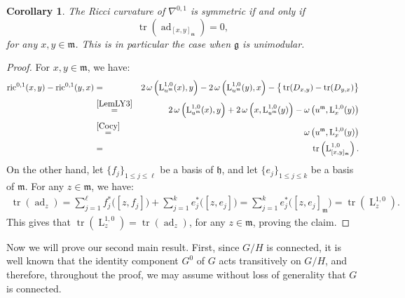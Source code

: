\documentclass[preprint,12pt,1p]{elsarticle}
\theoremstyle{plain}
\newtheorem{corollary}[theorem]{Corollary}
\theoremstyle{definition}
\newcommand{\n}{\nabla}
\newcommand{\nc}{\n^{0,1}}
\newcommand{\tr}{\operatorname{tr}}
\newcommand{\h}{\mathfrak{h}}
\newcommand{\m}{\mathfrak{m}}
\newcommand{\ad}{\operatorname{ad}}
\newcommand{\lm}{\operatorname{L}^{1,0}}
\newcommand{\ric}{\operatorname{ric}}
\numberwithin{equation}{section}
\newcommand{\somjk}{\displaystyle\sum_{j=1}^{k}}
\newcommand{\somjl}{\displaystyle\sum_{j=1}^{\ell}}
\begin{document}
\begin{corollary}\label{SymRicA}
The Ricci curvature of $\nc$ is symmetric if and only if
\begin{equation}
\tr\left(\ad_{[x,y]_\mathfrak{m}}\right)=0,
\end{equation}
for any $x,y\in\mathfrak{m}$. This is in particular the case when $\mathfrak{g}$ is unimodular.
\end{corollary}
\begin{proof}
For $x,y\in\mathfrak{m}$, we have:
\begin{eqnarray*}
\ric^{0,1}(x,y)-\ric^{0,1}(y,x)&=&2\,\omega\left(\lm_{u^\mathfrak{m}}(x),y\right)-2\,\omega\left(\lm_{u^\mathfrak{m}}(y),x\right)-\big\{\tr(D_{x,y})-\tr(D_{y,x})\big\}\\
&\stackrel{\rm\ref{LemLY3}}{=}&2\,\omega\left(\lm_{u^\mathfrak{m}}(x),y\right)+2\,\omega\left(x,\lm_{u^\mathfrak{m}}(y)\right)-\omega\left(u^\mathfrak{m},\lm_x(y)\right)\\
&\stackrel{\rm\eqref{Cocy}}{=}&\omega\left(u^\mathfrak{m},\lm_x(y)\right)\\
&=&\tr\left(\lm_{[x,y]_\m}\right).
\end{eqnarray*}
On the other hand, let $\{f_j\}_{1\leqslant j\leqslant \ell}$ be a basis of $\h$, and let $\{e_j\}_{1\leqslant j\leqslant k}$ be a basis of $\m$. For any $z\in\m$, we have:
\begin{eqnarray*}
	\tr(\ad_z)=\somjl f^*_j\big([z,f_j]\big)+\somjk e_j^*\big([z,e_j]\big)=\somjk e^*_j\big([z,e_j]_\m\big)=\tr\left(\lm_z\right).
\end{eqnarray*}
This gives that $\tr\left(\lm_z\right)=\tr\left(\ad_z\right)$, for any $z\in\mathfrak{m}$, proving the claim.
\end{proof}

Now we will prove our second main result. First, since $G/H$ is connected, it is well known that the identity component $G^0$ of $G$ acts transitively on $G/H$, and therefore, throughout the proof, we may assume without loss of generality that $G$ is connected.
\end{document}
